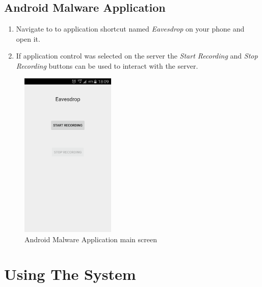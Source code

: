\documentclass[a4paper,12pt,titlepage]{article}
\begin{document}
\subsection{Android Malware Application}
\begin{enumerate} 
\item Navigate to to application shortcut named \textit{Eavesdrop} on your phone and open it.
\item If application control was selected on the server the \textit{Start Recording} and \textit{Stop Recording} buttons can be used to interact with the server.
\end{enumerate}
\begin{figure}[H]
\center
\includegraphics[height=8cm]{MalwareScreenshots/StartRecording}
\caption{Android Malware Application main screen}
\label{fig:my_label6}
\end{figure}




\section{Using The System}
\end{document}
